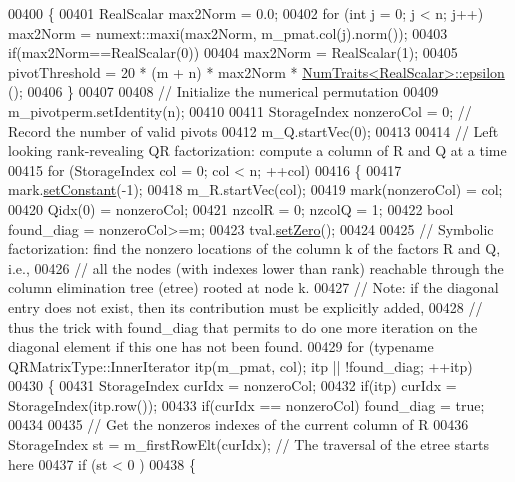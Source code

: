 \begin{DoxyCode}
00400   \{
00401     RealScalar max2Norm = 0.0;
00402     \textcolor{keywordflow}{for} (\textcolor{keywordtype}{int} j = 0; j < n; j++) max2Norm = numext::maxi(max2Norm, m\_pmat.col(j).norm());
00403     \textcolor{keywordflow}{if}(max2Norm==RealScalar(0))
00404       max2Norm = RealScalar(1);
00405     pivotThreshold = 20 * (m + n) * max2Norm * \hyperlink{group___core___module_struct_eigen_1_1_num_traits}{NumTraits<RealScalar>::epsilon}
      ();
00406   \}
00407   
00408   \textcolor{comment}{// Initialize the numerical permutation}
00409   m\_pivotperm.setIdentity(n);
00410   
00411   StorageIndex nonzeroCol = 0; \textcolor{comment}{// Record the number of valid pivots}
00412   m\_Q.startVec(0);
00413 
00414   \textcolor{comment}{// Left looking rank-revealing QR factorization: compute a column of R and Q at a time}
00415   \textcolor{keywordflow}{for} (StorageIndex col = 0; col < n; ++col)
00416   \{
00417     mark.\hyperlink{class_eigen_1_1_plain_object_base_ac8dea1df3d92b752cc683ff42abf6f9b}{setConstant}(-1);
00418     m\_R.startVec(col);
00419     mark(nonzeroCol) = col;
00420     Qidx(0) = nonzeroCol;
00421     nzcolR = 0; nzcolQ = 1;
00422     \textcolor{keywordtype}{bool} found\_diag = nonzeroCol>=m;
00423     tval.\hyperlink{class_eigen_1_1_plain_object_base_ac21ad5f989f320e46958b75ac8d9a1da}{setZero}(); 
00424     
00425     \textcolor{comment}{// Symbolic factorization: find the nonzero locations of the column k of the factors R and Q, i.e.,}
00426     \textcolor{comment}{// all the nodes (with indexes lower than rank) reachable through the column elimination tree (etree)
       rooted at node k.}
00427     \textcolor{comment}{// Note: if the diagonal entry does not exist, then its contribution must be explicitly added,}
00428     \textcolor{comment}{// thus the trick with found\_diag that permits to do one more iteration on the diagonal element if this
       one has not been found.}
00429     \textcolor{keywordflow}{for} (\textcolor{keyword}{typename} QRMatrixType::InnerIterator itp(m\_pmat, col); itp || !found\_diag; ++itp)
00430     \{
00431       StorageIndex curIdx = nonzeroCol;
00432       \textcolor{keywordflow}{if}(itp) curIdx = StorageIndex(itp.row());
00433       \textcolor{keywordflow}{if}(curIdx == nonzeroCol) found\_diag = \textcolor{keyword}{true};
00434       
00435       \textcolor{comment}{// Get the nonzeros indexes of the current column of R}
00436       StorageIndex st = m\_firstRowElt(curIdx); \textcolor{comment}{// The traversal of the etree starts here}
00437       \textcolor{keywordflow}{if} (st < 0 )
00438       \{

\end{DoxyCode}
